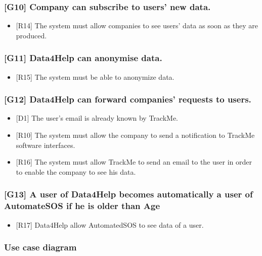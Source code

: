 \documentclass{article}
\begin{document}
\subsubsection{[G10] Company can subscribe to users’ new data.}
\begin{itemize}
\item {[R14]} The system must allow companies to see users' data as soon as they are produced.
\end{itemize}
\subsubsection{[G11] Data4Help can anonymise data.}
\begin{itemize}
\item {[R15]} The system must be able to anonymize data.
\end{itemize}
\subsubsection{[G12] Data4Help can forward companies’ requests to users.}
\begin{itemize}
\item {[D1]} The user’s email is already known by TrackMe.
\item {[R10]} The system must allow the company to send a notification to TrackMe software interfaces.
\item {[R16]} The system must allow TrackMe to send an email to the user in order to enable the company to see his data.
\end{itemize}
\subsubsection{[G13] A user of Data4Help becomes automatically a user of AutomateSOS if he is older than Age}
\begin{itemize}
\item {[R17]} Data4Help allow AutomatedSOS to see data of a user.
\end{itemize}\newpage
\subsubsection{Use case diagram}
\end{document}
